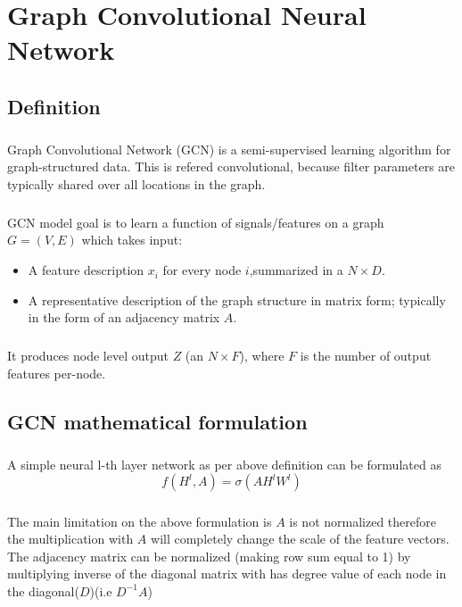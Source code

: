 \chapter{Graph Convolutional Neural Network}
\section{Definition}
\paragraph{} Graph Convolutional Network (GCN) is a semi-supervised learning algorithm for graph-structured data. This is
refered convolutional, because filter parameters are typically shared over all locations in the graph.
\paragraph{} GCN model goal is to learn a function of signals/features on a graph $G=(V,E)$
which takes input:
\begin{itemize}
    \item A feature description $x_i$ for every node $i$,summarized in a $N \times D$.
    \item A representative description of the graph structure in matrix form; typically in the form of an adjacency matrix $A$.
\end{itemize}
\paragraph{} It produces node level output $Z$ (an $N \times F$), where $F$ is the 
number of output features per-node.
\section{GCN mathematical formulation}
\paragraph{} A simple neural l-th layer network as per above definition can be formulated as
\begin{equation}
    f(H^l,A) = \sigma(A H^l W^l)
\end{equation}
\paragraph{} The main limitation on the above formulation is $A$ is not normalized therefore 
the multiplication with $A$ will completely change the scale of the feature vectors. The adjacency
matrix can be normalized (making row sum equal to 1) by multiplying inverse of the diagonal matrix with has
degree value of each node in the diagonal($D$)(i.e $D^{-1}A$)
